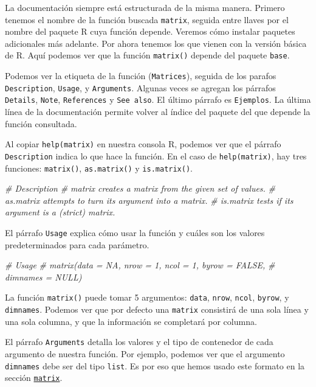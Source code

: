 \documentclass[]{book}
\newenvironment{Shaded}{\begin{snugshade}}{\end{snugshade}}
\newcommand{\CommentTok}[1]{\textcolor[rgb]{0.56,0.35,0.01}{\textit{#1}}}
\begin{document}
La documentación siempre está estructurada de la misma manera. Primero
tenemos el nombre de la función buscada \texttt{matrix}, seguida entre
llaves por el nombre del paquete R cuya función depende. Veremos cómo
instalar paquetes adicionales más adelante. Por ahora tenemos los que
vienen con la versión básica de R. Aquí podemos ver que la función
\texttt{matrix()} depende del paquete \texttt{base}.

Podemos ver la etiqueta de la función (\texttt{Matrices}), seguida de
los parafos \texttt{Description}, \texttt{Usage}, y \texttt{Arguments}.
Algunas veces se agregan los párrafos \texttt{Details}, \texttt{Note},
\texttt{References} y \texttt{See\ also}. El último párrafo es
\texttt{Ejemplos}. La última línea de la documentación permite volver al
índice del paquete del que depende la función consultada.

Al copiar \texttt{help(matrix)} en nuestra consola R, podemos ver que el
párrafo \texttt{Description} indica lo que hace la función. En el caso
de \texttt{help(matrix)}, hay tres funciones: \texttt{matrix()},
\texttt{as.matrix()} y \texttt{is.matrix()}.

\begin{Shaded}
\begin{Highlighting}[]
\CommentTok{# Description}
\CommentTok{# matrix creates a matrix from the given set of values.}
\CommentTok{# as.matrix attempts to turn its argument into a matrix.}
\CommentTok{# is.matrix tests if its argument is a (strict) matrix.}
\end{Highlighting}
\end{Shaded}

El párrafo \texttt{Usage} explica cómo usar la función y cuáles son los
valores predeterminados para cada parámetro.

\begin{Shaded}
\begin{Highlighting}[]
\CommentTok{# Usage}
\CommentTok{# matrix(data = NA, nrow = 1, ncol = 1, byrow = FALSE,}
\CommentTok{#        dimnames = NULL)}
\end{Highlighting}
\end{Shaded}

La función \texttt{matrix()} puede tomar 5 argumentos: \texttt{data},
\texttt{nrow}, \texttt{ncol}, \texttt{byrow}, y \texttt{dimnames}.
Podemos ver que por defecto una \texttt{matrix} consistirá de una sola
línea y una sola columna, y que la información se completará por
columna.

El párrafo \texttt{Arguments} detalla los valores y el tipo de
contenedor de cada argumento de nuestra función. Por ejemplo, podemos
ver que el argumento \texttt{dimnames} debe ser del tipo \texttt{list}.
Es por eso que hemos usado este formato en la sección
\protect\hyperlink{l014matrix}{\texttt{matrix}}.
\end{document}
